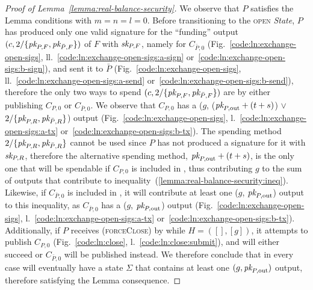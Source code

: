 \begin{proof}[Proof of Lemma~\ref{lemma:real-balance-security}]
  We observe that $P$ satisfies the Lemma conditions with $m = n = l = 0$.
  Before transitioning to the \textsc{open} \textit{State}, $P$ has produced
  only one valid signature for the ``funding'' output $(c, 2/\{\textit{pk}_{P, F},
  \textit{pk}_{\bar{P}, F}\})$ of $F$ with $\textit{sk}_{P, F}$, namely for $C_{\bar{P}, 0}$
  (Fig.~\ref{code:ln:exchange-open-sigs},
  ll.~\ref{code:ln:exchange-open-sigs:a-sign}
  or~\ref{code:ln:exchange-open-sigs:b-sign}), and sent it to $\bar{P}$
  (Fig.~\ref{code:ln:exchange-open-sigs},
  ll.~\ref{code:ln:exchange-open-sigs:a-send}
  or~\ref{code:ln:exchange-open-sigs:b-send}), therefore the only two ways to
  spend $(c, 2/\{\textit{pk}_{P, F}, \textit{pk}_{\bar{P}, F}\})$ are by either publishing $C_{P,
  0}$ or $C_{\bar{P}, 0}$. We observe that $C_{P, 0}$ has a ($g$, ($\textit{pk}_{P,
  \mathrm{out}} + (t + s)$) $\vee$ $2/\{\textit{pk}_{P, R}, \textit{pk}_{\bar{P}, R}\}$) output
  (Fig.~\ref{code:ln:exchange-open-sigs},
  l.~\ref{code:ln:exchange-open-sigs:a-tx}
  or~\ref{code:ln:exchange-open-sigs:b-tx}). The spending method $2/\{\textit{pk}_{P, R},
  \textit{pk}_{\bar{P}, R}\}$ cannot be used since $P$ has not produced a signature for
  it with $\textit{sk}_{P, R}$, therefore the alternative spending method, $\textit{pk}_{P,
  \mathrm{out}} + (t + s)$, is the only one that will be spendable if $C_{P, 0}$
  is included in \ledger, thus contributing $g$ to the sum of outputs that
  contribute to inequality~(\ref{lemma:real-balance-security:ineq}). Likewise,
  if $C_{\bar{P}, 0}$ is included in \ledger, it will contribute at least one
  ($g$, $\textit{pk}_{P, \mathrm{out}}$) output to this inequality, as $C_{\bar{P}, 0}$
  has a ($g$, $\textit{pk}_{P, \mathrm{out}}$) output
  (Fig.~\ref{code:ln:exchange-open-sigs},
  l.~\ref{code:ln:exchange-open-sigs:a-tx}
  or~\ref{code:ln:exchange-open-sigs:b-tx}). Additionally, if $P$ receives
  (\textsc{forceClose}) by \environment while $H = ([], [g])$, it attempts to publish
  $C_{P, 0}$ (Fig.~\ref{code:ln:close}, l.~\ref{code:ln:close:submit}), and will
  either succeed or $C_{\bar{P}, 0}$ will be published instead. We therefore
  conclude that in every case \ledger will eventually have a state $\Sigma$ that
  contains at least one $(g, \textit{pk}_{P, \mathrm{out}})$ output, therefore satisfying
  the Lemma consequence.


\end{proof}
